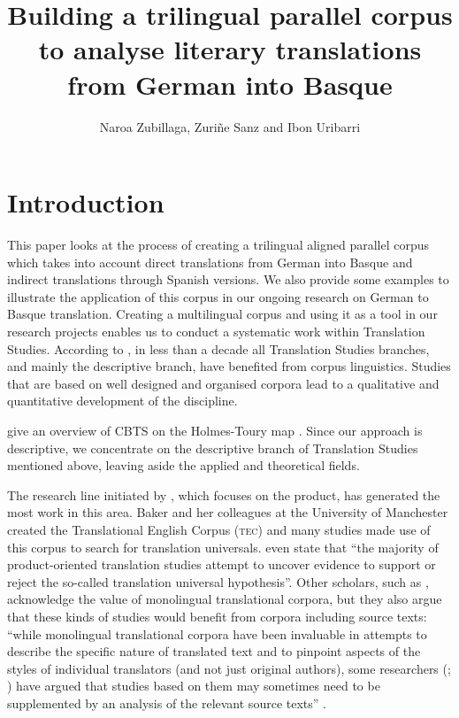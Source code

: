 \documentclass[output=paper]{LSP/langsci}
\author{Naroa Zubillaga, Zuriñe Sanz and Ibon Uribarri}
\title{Building a trilingual parallel corpus to analyse literary translations from {German into Basque}}
\begin{document}
\section{Introduction} \label{sec:3:1}
  
This paper looks at the process of creating a trilingual aligned parallel corpus which takes into account direct translations from German into Basque and indirect translations through Spanish versions. We also provide some examples to illustrate the application of this corpus in our ongoing research on German to Basque translation. Creating a multilingual corpus and using it as a tool in our research projects enables us to conduct a systematic work within Translation Studies. According to \citet[216]{Corpas2008}, in less than a decade all Translation Studies branches, and mainly the descriptive branch, have benefited from corpus linguistics. Studies that are based on well designed and organised corpora lead to a qualitative and quantitative development of the discipline.

\citet{Xiao2009} give an overview of CBTS on the Holmes-Toury map \citep[243]{Xiao2009}. Since our approach is descriptive, we concentrate on the descriptive branch of Translation Studies mentioned above, leaving aside the applied and theoretical fields.

The research line initiated by \citet{Baker1993}, which focuses on the product, has generated the most work in this area. Baker and her colleagues at the University of Manchester created the Translational English Corpus (\textsc{tec}) and many studies \citep[e.g.][]{Lavios1998b,Olohan2000,Olohan2003} made use of this corpus to search for translation universals. \citet[244]{Xiao2009} even state that “the majority of product-oriented translation studies attempt to uncover evidence to support or reject the so-called translation universal hypothesis”. Other scholars, such as \citet{Kenny2001}, acknowledge the value of monolingual translational corpora, but they also argue that these kinds of studies would benefit from corpora including source texts: “while monolingual translational corpora have been invaluable in attempts to describe the specific nature of translated text and to pinpoint aspects of the styles of individual translators (and not just original authors), some researchers (\citealt[565]{Lavios1998b}; \citealt[565]{Puurtinen1998}) have argued that studies based on them may sometimes need to be supplemented by an analysis of the relevant source texts” \citep[62]{Kenny2001}.
\end{document}
